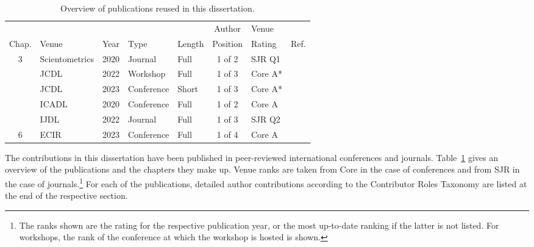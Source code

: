 \begin{table}[tb]
\centering
  \caption{Overview of publications reused in this dissertation.}
  \label{tab:primarypublicationoverview}
  \begin{tabular}{cllllclr}
    \hline
    \ & \ & \ & \ & \ & Author & Venue & \ \\
    Chap. & Venue & Year & Type & Length & Position & Rating & Ref. \\
    \hline
    3 & Scientometrics & 2020 & Journal & Full & 1 of 2 & SJR Q1 & \cite{Saier2020} \\
    \arrayrulecolor{lightgrey}\cline{1-8}
    \multirow{2}{*}{4} & JCDL & 2022 & Workshop & Full & 1 of 3 & Core A* & \cite{Saier2022ULITE} \\
    \ & JCDL & 2023 & Conference & Short & 1 of 3 & Core A* & \cite{Saier2023unarXive} \\
    \arrayrulecolor{lightgrey}\cline{1-8}
    \multirow{2}{*}{5} & ICADL & 2020 & Conference & Full & 1 of 2 & Core A & \cite{Saier2020xling} \\
    \ & IJDL & 2022 & Journal & Full & 1 of 3 & SJR Q2 & \cite{Saier2021} \\
    \arrayrulecolor{lightgrey}\cline{1-8}\arrayrulecolor{black}
    6 & ECIR & 2023 & Conference & Full & 1 of 4 & Core A & \cite{Saier2023hyperpie} \\
    \hline
    \end{tabular}
\end{table}

The contributions in this dissertation have been published in peer-reviewed international conferences and journals. Table~\ref{tab:primarypublicationoverview} gives an overview of the publications and the chapters they make up. Venue ranks are taken from Core in the case of conferences and from SJR in the case of journals.\footnote{The ranks shown are the rating for the respective publication year, or the most up-to-date ranking if the latter is not listed. For workshops, the rank of the conference at which the workshop is hosted is shown.} For each of the publications, detailed author contributions according to the Contributor Roles Taxonomy are listed at the end of the respective section.

